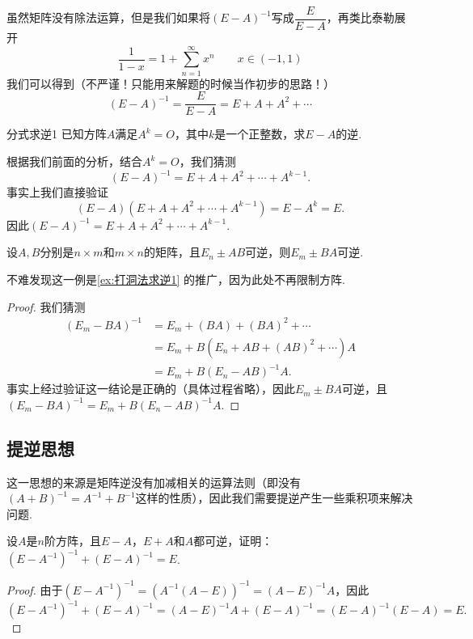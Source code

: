 虽然矩阵没有除法运算，但是我们如果将$(E-A)^{-1}$写成$\dfrac{E}{E-A}$，再类比泰勒展开
\[\frac{1}{1-x}=1+\sum_{n=1}^\infty x^n \qquad x\in (-1,1)\]
我们可以得到（不严谨！只能用来解题的时候当作初步的思路！）
\[(E-A)^{-1}=\frac{E}{E-A}=E+A+A^2+\cdots\]

\begin{example}{}{分式求逆1}
    已知方阵$A$满足$A^k=O$，其中$k$是一个正整数，求$E-A$的逆.
\end{example}

\begin{solution}
    根据我们前面的分析，结合$A^k=O$，我们猜测
    \[(E-A)^{-1}=E+A+A^2+\cdots+A^{k-1}.\]
    事实上我们直接验证
    \[(E-A)(E+A+A^2+\cdots+A^{k-1})=E-A^k=E.\]
    因此$(E-A)^{-1}=E+A+A^2+\cdots+A^{k-1}$.
\end{solution}

\begin{example}{}{}
    设$A,B$分别是$n \times m$和$m \times n$的矩阵，且$E_n \pm AB$可逆，则$E_m \pm BA$可逆.
\end{example}
不难发现这一例是\autoref{ex:打洞法求逆1} 的推广，因为此处不再限制方阵.

\begin{proof}
    我们猜测
    \begin{align*}
        (E_m-BA)^{-1} & =E_m+(BA)+(BA)^2+\cdots       \\
                      & =E_m+B(E_n+AB+(AB)^2+\cdots)A \\
                      & =E_m+B(E_n-AB)^{-1}A.
    \end{align*}
    事实上经过验证这一结论是正确的（具体过程省略），因此$E_m \pm BA$可逆，且$(E_m-BA)^{-1}=E_m+B(E_n-AB)^{-1}A$.
\end{proof}

\subsection{提逆思想}

这一思想的来源是矩阵逆没有加减相关的运算法则（即没有$(A+B)^{-1}=A^{-1}+B^{-1}$这样的性质），因此我们需要提逆产生一些乘积项来解决问题.
\begin{example}{}{}
    设$A$是$n$阶方阵，且$E-A$，$E+A$和$A$都可逆，证明：$(E-A^{-1})^{-1}+(E-A)^{-1}=E$.
\end{example}

\begin{proof}
    由于$(E-A^{-1})^{-1}=(A^{-1}(A-E))^{-1}=(A-E)^{-1}A$，因此
    \[(E-A^{-1})^{-1}+(E-A)^{-1}=(A-E)^{-1}A+(E-A)^{-1}=(E-A)^{-1}(E-A)=E.\]
\end{proof}


